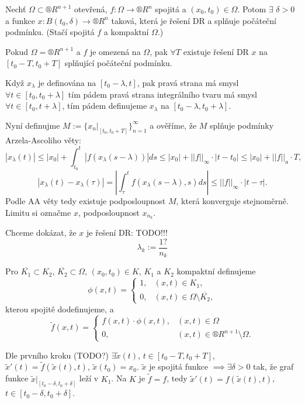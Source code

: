\documentclass[12pt]{article}					%
\begin{document}
\begin{veta}
	Nechť $\Omega \subset ®R^{n + 1}$ otevřená, $f: \Omega \rightarrow ®R^n$ spojitá a $(x_0, t_0) \in \Omega$. Potom $\exists$ $\delta > 0$ a funkce $x: B(t_0, \delta) \rightarrow ®R^n$ taková, která je řešení DR a splňuje počáteční podmínku. (Stačí spojitá $f$ a kompaktní $\Omega$.)

	\begin{tvrzeni}
		Pokud $\Omega = ®R^{n+1}$ a $f$ je omezená na $\Omega$, pak $\forall T$ existuje řešení DR $x$ na $[t_0 - T, t_0 + T]$ splňující počáteční podmínku.

		\begin{dukazin}
			Když $x_{\lambda}$ je definována na $[t_0 - \lambda, t]$, pak pravá strana má smysl $\forall t \in [t_0, t_0 + \lambda]$ tím pádem pravá strana integrálního tvaru má smysl $\forall t \in [t_0, t + \lambda]$, tím pádem definujeme $x_{\lambda}$ na $[t_0 - \lambda, t_0 + \lambda]$.

			Nyní definujme $M := \{x_n|_{[t_0, t_0 + T]}\}_{n=1}^∞$ a ověříme, že $M$ splňuje podmínky Arzela-Ascoliho věty:
			$$ |x_\lambda(t)| ≤ |x_0| + \int_{t_0}^t |f(x_\lambda(s - \lambda))| ds ≤ |x_0| + ||f||_∞ · |t - t_0| ≤ |x_0| + ||f||_a · T, $$
			$$ |x_{\lambda}(t) - x_{\lambda}(\tau)| = \left|\int_\tau^t f(x_\lambda(s - \lambda), s) ds\right| ≤ ||f||_∞·|t - \tau|. $$
			Podle AA věty tedy existuje podposloupnost $M$, která konverguje stejnoměrně. Limitu si označme $x$, podposloupnost $x_{n_k}$.

			Chceme dokázat, že $x$ je řešení DR: TODO!!!
			$$ \lambda_k := \frac{1?}{n_k} $$
		\end{dukazin}
	\end{tvrzeni}

	\begin{dukazin}
%
%
		Pro $\overline{K_1} \subset K_2$, $\overline{K_2} \subset \Omega$, $(x_0, t_0) \in K$, $K_1$ a $K_2$ kompaktní definujeme
		$$ \phi(x, t) = \begin{cases}1, & (x, t) \in K_1,\\0, & (x, t) \in \Omega \setminus \overline{K_2},\end{cases}$$
		kterou spojitě dodefinujeme, a
		$$ \tilde{f} (x, t) = \begin{cases}f(x, t)·\phi(x, t), & (x, t) \in \Omega \\ 0, & (x, t) \in ®R^{n+1} \setminus \Omega.\end{cases} $$

		Dle prvního kroku (TODO?) $\exists \tilde{x}(t)$, $t \in [t_0 - T, t_0 + T]$, $\tilde{x}'(t) = \tilde{f}(\tilde{x}(t), t)$, $\tilde{x}(t_0) = x_0$. $\tilde{x}$ je spojitá funkce $\implies \exists \delta > 0$ tak, že graf funkce $\tilde{x}|_{[t_0 - \delta, t_0 + \delta]}$ leží v $K_1$. Na $K$ je $\tilde{f} = f$, tedy $\tilde{x}'(t) = f(\tilde{x}(t), t)$, $t \in [t_0 - \delta, t_0 + \delta]$.
	\end{dukazin}
\end{veta}
\end{document}
